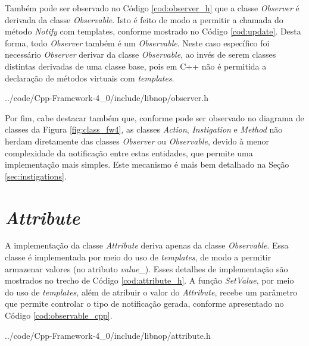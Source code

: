 Também pode ser observado no Código \ref{cod:observer_h} que a classe
\textit{Observer} é derivada da classe \textit{Observable}. Isto é feito de modo
a permitir a chamada do método \textit{Notify} com templates, conforme mostrado
no Código \ref{cod:update}. Desta forma, todo \textit{Observer} também é um
\textit{Observable}. Neste caso específico foi necessário \textit{Observer}
derivar da classe \textit{Observable}, ao invés de serem classes distintas
derivadas de uma classe base, pois em C++ não é permitida a declaração de
métodos virtuais com \textit{templates}.


            {../code/Cpp-Framework-4_0/include/libnop/observer.h}
\FloatBarrier

Por fim, cabe destacar também que, conforme pode ser observado no diagrama de
classes da Figura \ref{fig:class_fw4}, as classes \textit{Action},
\textit{Instigation} e \textit{Method} não herdam diretamente das classes
\textit{Observer} ou \textit{Observable}, devido à menor complexidade da
notificação entre estas entidades, que permite uma implementação mais simples.
Este mecanismo é mais bem detalhado na Seção \ref{sec:instigations}.

\section{\textit{Attribute}}

A implementação da classe \textit{Attribute} deriva apenas da classe
\textit{Observable}. Essa classe é implementada por meio do uso de
\textit{templates}, de modo a permitir armazenar valores (no atributo
\textit{value\_}). Esses detalhes de implementação são mostrados no trecho de
Código \ref{cod:attribute_h}. A função \textit{SetValue}, por meio do uso de
\textit{templates}, além de atribuir o valor do \textit{Attribute}, recebe um
parâmetro que permite controlar o tipo de notificação gerada, conforme
apresentado no Código \ref{cod:observable_cpp}.


            {../code/Cpp-Framework-4_0/include/libnop/attribute.h}

